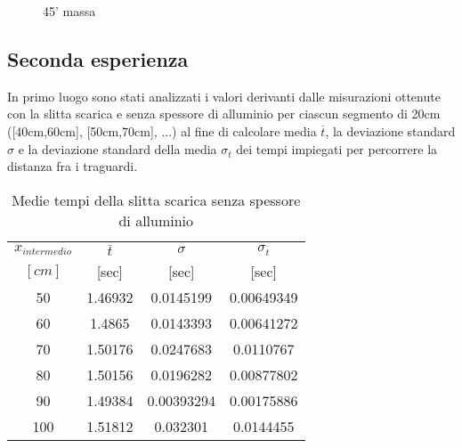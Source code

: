 \documentclass[a4paper,11pt,oneside]{article}
\begin{document}
\begin{figure}[h!]
    \centering
    \caption{45' massa}
\end{figure}

\newpage

\subsection{Seconda esperienza}
In primo luogo sono stati analizzati i valori derivanti dalle misurazioni ottenute con la slitta scarica e senza spessore di alluminio per ciascun segmento di 20cm ([40cm,60cm], [50cm,70cm], ...) al fine di calcolare media $\overline{t}$, la deviazione standard $\sigma$ e la deviazione standard della media $\sigma_{\overline{t}}$ dei tempi impiegati per percorrere la distanza fra i traguardi.\\

\begin{table}[h!]%
\centering
\begin{tabular}{c|ccc}
\toprule
$x_{intermedio}$&$\overline{t}$&$\sigma$&$\sigma_{\overline{t}}$\\
$[\si{cm}]$&[sec]&[sec]&[sec]\\
\midrule
50	&1.46932	&0.0145199	&0.00649349\\
60	&1.4865	    &0.0143393	&0.00641272\\
70	&1.50176	&0.0247683	&0.0110767\\
80	&1.50156	&0.0196282	&0.00877802\\
90	&1.49384	&0.00393294	&0.00175886\\
100	&1.51812	&0.032301	&0.0144455\\
\bottomrule
\end{tabular}
    \caption{Medie tempi della slitta scarica senza spessore di alluminio}
    \label{tab:nm_na}
\end{table}
\end{document}
